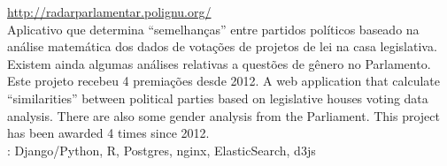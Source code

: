 \documentclass[]{friggeri-cv}
\begin{document}
%
%
\textbf{} \hfill \href{http://radarparlamentar.polignu.org/}{http://radarparlamentar.polignu.org/}\\
%
{Aplicativo que determina ``semelhanças'' entre partidos \nohyphens{políticos} baseado na análise matemática dos dados de votações de projetos de lei na casa \nohyphens{legislativa}. Existem ainda algumas análises relativas a questões de gênero no Parlamento.\\
Este projeto recebeu 4 premiações desde 2012.}%
{A web application that calculate ``similarities'' between political parties based on legislative houses voting data analysis. There are also some gender analysis from the Parliament. 
This project has been awarded 4 times since 2012.}\\
: Django/Python, R, Postgres, nginx, ElasticSearch, d3js
\end{document}
